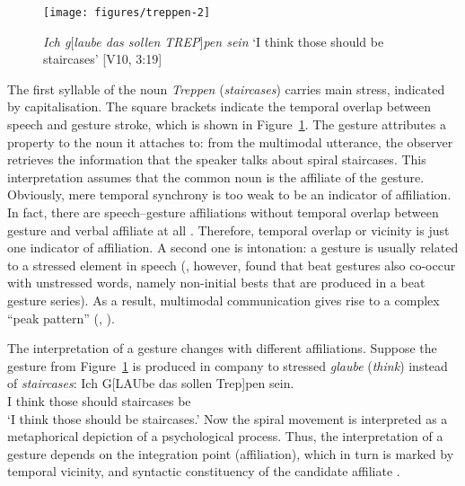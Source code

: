 \documentclass[output=paper,biblatex,babelshorthands,newtxmath,draftmode,colorlinks,citecolor=brown]{langscibook}
\begin{document}
\begin{figure}[tb]
  \texttt{[image: figures/treppen-2]}
  \caption[Staircases]{\textit{Ich g}[\textit{laube das sollen TREP}]\textit{pen sein} \enquote*{I think those should be staircases} [V10, 3:19]}
  \label{fig:staircases}
\end{figure}

\noindent The first syllable of the  noun \textit{Treppen} (\textit{staircases}) carries main stress, indicated by capitalisation. 
%
The square brackets indicate the temporal overlap between speech and gesture stroke, which is shown in Figure~\ref{fig:staircases}.
%
The gesture attributes a property to the noun it attaches to: from the multimodal utterance, the observer retrieves the information that the speaker talks about spiral staircases. 
%
This interpretation assumes that the common noun is the affiliate of the gesture.
%
Obviously, mere temporal synchrony is too weak to be an indicator of affiliation.
%
In fact, there are speech--gesture affiliations without temporal overlap between gesture and verbal affiliate at all \citep[e.g.][]{Luecking:Rieser:Stegmann:2004}.
%
Therefore, temporal overlap or vicinity is just one indicator of affiliation. A second one is intonation: a gesture is usually related to a stressed element in speech \citep[]{Loehr:2007} (\citealp{McClave:1994}, however, found that beat gestures also co-occur with unstressed words, namely non-initial bests that are produced in a beat gesture series).
%
As a result, multimodal communication gives rise to a complex \enquote{peak pattern} (\citealp[]{Tuite:1993}, \citealp[]{Loehr:2004}).


The interpretation of a gesture changes with different affiliations.
%
Suppose the gesture from Figure~\ref{fig:staircases} is produced in company to stressed \textit{glaube} (\textit{think}) instead of \textit{staircases}: 
%
\ea \label{ex:think}
\gll Ich G[LAUbe das sollen Trep]pen sein.\\
     I think those should staircases be \\
\glt \enquote*{I think those should be staircases.}
\z
%
Now the spiral movement is interpreted as a metaphorical depiction of a psychological process.
%
Thus, the interpretation of a gesture depends on the integration point (affiliation), which in turn is marked by temporal vicinity,  and syntactic constituency of the candidate affiliate \citep{Alahverdzhieva:Lascarides:Flickinger:2017}.
\end{document}
